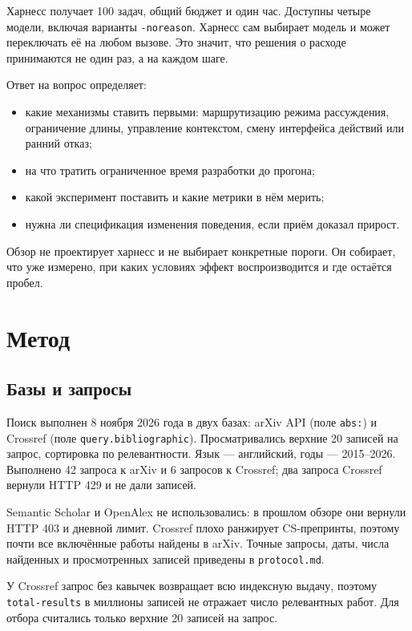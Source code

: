 \documentclass[11pt,a4paper]{article}
\newcommand{\code}[1]{\texttt{#1}}
\begin{document}
Харнесс получает 100 задач, общий бюджет и один час. Доступны четыре
модели, включая варианты \code{-noreason}. Харнесс сам выбирает модель и
может переключать её на любом вызове. Это значит, что решения о расходе
принимаются не один раз, а на каждом шаге.

Ответ на вопрос определяет:

\begin{itemize}
  \item какие механизмы ставить первыми: маршрутизацию режима рассуждения,
        ограничение длины, управление контекстом, смену интерфейса действий
        или ранний отказ;
  \item на что тратить ограниченное время разработки до прогона;
  \item какой эксперимент поставить и какие метрики в нём мерить;
  \item нужна ли спецификация изменения поведения, если приём доказал
        прирост.
\end{itemize}

Обзор не проектирует харнесс и не выбирает конкретные пороги. Он собирает,
что уже измерено, при каких условиях эффект воспроизводится и где остаётся
пробел.

\section{Метод}

\subsection{Базы и запросы}

Поиск выполнен 8 ноября 2026 года в двух базах: arXiv API (поле
\code{abs:}) и Crossref (поле \code{query.bibliographic}). Просматривались
верхние 20 записей на запрос, сортировка по релевантности. Язык —
английский, годы — 2015--2026. Выполнено 42 запроса к arXiv и 6 запросов к
Crossref; два запроса Crossref вернули HTTP 429 и не дали записей.

Semantic Scholar и OpenAlex не использовались: в прошлом обзоре они вернули
HTTP 403 и дневной лимит. Crossref плохо ранжирует CS-препринты, поэтому
почти все включённые работы найдены в arXiv. Точные запросы, даты, числа
найденных и просмотренных записей приведены в \code{protocol.md}.

У Crossref запрос без кавычек возвращает всю индексную выдачу, поэтому
\code{total-results} в миллионы записей не отражает число релевантных
работ. Для отбора считались только верхние 20 записей на запрос.
\end{document}
